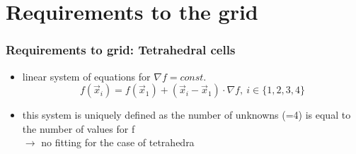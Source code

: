 \documentclass{beamer}
\begin{document}

\section{Requirements to the grid}
\begin{frame}
\frametitle{Requirements to grid: Tetrahedral cells}
\begin{itemize}
	\item linear system of equations for $\nabla f = const.$
 \begin{equation}
		\nonumber
		f(\vec{x}_i) = f(\vec{x}_1) + \left(\vec{x}_i-\vec{x}_1\right)\cdot \nabla f, ~i \in \{1,2,3,4\}
	\end{equation}
	\item this system is uniquely defined as the number of unknowns (=4) is equal to the number of values for f\\
	 $\rightarrow$ no fitting for the case of tetrahedra
\end{itemize}
\end{frame}
\end{document}
